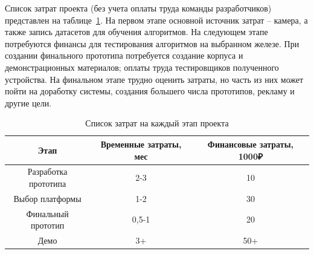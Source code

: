 \documentclass[a4paper,14pt]{article}
\begin{document}
Список затрат проекта (без учета оплаты труда команды разработчиков) представлен на таблице~\ref{tab:my-table}.
На первом этапе основной источник затрат -- камера, а также запись датасетов для обучения алгоритмов.
На следующем этапе потребуются финансы для тестирования алгоритмов на выбранном железе.
При создании финального прототипа потребуется создание корпуса и демонстрационных материалов; оплаты труда тестировщиков полученного устройства.
На финальном этапе трудно оценить затраты, но часть из них может пойти на доработку системы, создания большего числа прототипов, рекламу и другие цели.

\begin{table}[H]
	\caption{Список затрат на каждый этап проекта}
	\label{tab:my-table}
	\begin{tabular}{|c|c|c|}
		\hline
		Этап                 & Временные затраты, мес & Финансовые затраты, 1000₽ \\ \hline
		Разработка прототипа & 2-3                    & 10                        \\ \hline
		Выбор платформы      & 1-2                    & 30                        \\ \hline
		Финальный прототип   & 0,5-1                  & 20                        \\ \hline
		Демо                 & 3+                     & 50+                       \\ \hline
	\end{tabular}
\end{table}
\end{document}
